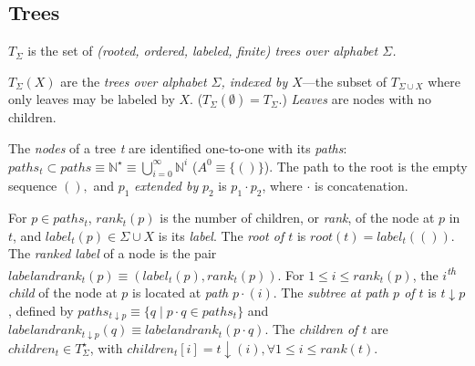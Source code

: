 \documentclass[english]{article}
\newcommand\comment[1]{}
\newcommand\into{\rightarrow}
\newcommand\logand{\wedge}
\newcommand\union{\cup}
\newcommand\intersect{\cap}
\newcommand\concat{\cdot}
\newcommand\naturals{\mathbb{N}}
\newcommand\domain[1]{\text{dom }#1}
\newcommand\st{\;|\;}
\newcommand{\nth}[2]{#1\textsuperscript{\textit{#2}}}
\newcommand{\kstar}{^{\star}}
\begin{document}
\comment{
The \emph{intersection}, or \emph{product}, of multisets $M$ and $N$ is $M\intersect N \equiv \{(x,ab)\st
(x,a)\in{M} \logand (x,b)\in{N}\}$.  Their \emph{union}, or \emph{sum} is $M\union N$ defined by
$M\union N:(\domain{M})\union (\domain{N}) \into \naturals$ where $(M\union
N)(x)\equiv M(x)+N(x)$.  The \emph{size} of a multiset $M$ is $|M|\equiv
\sum_{x\in{M}}M(x)$.  A multiset $M$ can be \emph{scaled} by a constant $k\in
\naturals$: $kM\equiv \{(x,km)\st (x,m)\in M\}$.

The \emph{factorial of a multiset $M$} is the set of unique permutations
$M!\subset \Sigma\kstar$ that are equivalent to $M$ when considered as a
multiset.  The number of unique permutations of a multiset $M$ is given by
\[
|M!|=\frac{|M|!}{\prod_{(x,m)\in{M}}m!}
\]
since all the $M(x)!$ ways of reordering
the $M(x)$ identical items $x\in M$ are indistinguishable.  The multiset
factorial of a sequence can be generated in the tradition of sequence
permutations, except doing nothing when two items to be swapped are equal,
instead of explicitly counting the multiplicity of the unique elements.
}

\subsection{Trees}

$T_{\Sigma}$ is the set of \emph{(rooted, ordered, labeled, finite) trees over
  alphabet $\Sigma$.}

$T_{\Sigma}(X)$ are the \emph{trees over alphabet $\Sigma$, indexed by $X$}---the subset of $T_{\Sigma\union X}$ where only leaves may be labeled by $X$.
($T_{\Sigma}(\emptyset)=T_{\Sigma}$.)  \emph{Leaves} are nodes with no children.

The \emph{nodes} of a tree \emph{t} are identified one-to-one with its
\emph{paths}: \emph{}$paths_{t}\subset paths\equiv \naturals \kstar \equiv\bigcup_{i=0}^{\infty}\naturals^{i}$ ($A^{0}\equiv\{()\}$).  The path
to the root is the empty sequence $(),$ and $p_{1}$ \emph{extended by} $p_{2}$
is $p_{1}\concat p_{2}$, where $\concat$ is concatenation.

For $p\in{paths_{t}}$, $rank_{t}(p)$ is the number of children, or \emph{rank},
of the node at $p$ in $t$, and $label_{t}(p)\in{\Sigma} \union X$ is its \emph{label}. The \emph{root of $t$} is $root(t)=label_{t}(())$. The
\emph{ranked label} of a node is the pair
$labelandrank_{t}(p)\equiv(label_{t}(p),rank_{t}(p))$. For $1\leq i\leq
rank_{t}(p)$, the \nth{$i$}{th} \emph{child} of the node at $p$ is located at
\emph{path} $p\concat(i)$.  The \emph{subtree at path $p$ of $t$} is $t\downarrow p$,
defined by $paths_{t\downarrow p}\equiv\{ q\st p\concat q\in{paths_{t}}\}$ and
$labelandrank_{t\downarrow p}(q)\equiv labelandrank_{t}(p\concat q)$.  The
\emph{children of $t$} are $children_t\in T_\Sigma\kstar$, with
$children_t[i]=t\downarrow (i), \forall 1\leq i \leq rank(t)$.
\end{document}
